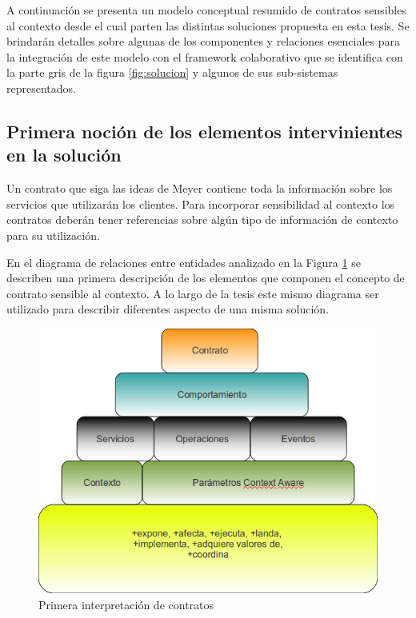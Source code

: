 {A continuación se presenta un modelo conceptual resumido de contratos sensibles
al contexto desde el cual parten las distintas soluciones propuesta en esta
tesis. Se brindarán detalles sobre algunas de los componentes y relaciones
esenciales para la integración de este modelo con el framework colaborativo que
se identifica con la parte gris de la figura \ref{fig:solucion} y algunos de
sus sub-sistemas representados.


\subsection{Primera noción de los elementos intervinientes en la solución}


Un contrato que siga las ideas de Meyer contiene toda la información
sobre los servicios que utilizarán los clientes. Para incorporar sensibilidad
al contexto los contratos deberán tener referencias sobre algún tipo de
información de contexto para su utilización.


En el diagrama de relaciones entre entidades analizado en la Figura
\ref{fig:contratosv1} se describen una primera descripción de los elementos
que componen el concepto de contrato sensible al contexto. A lo largo de la
tesis este mismo diagrama ser utilizado para describir diferentes aspecto de
una misma solución. 


\begin{figure}[h]
\begin{center}
 \includegraphics[width=4 in,totalheight=3 in] {Ch0/contratosv1}
\caption{Primera interpretación de contratos} \label{fig:contratosv1}
\end{center}
\end{figure}



}

